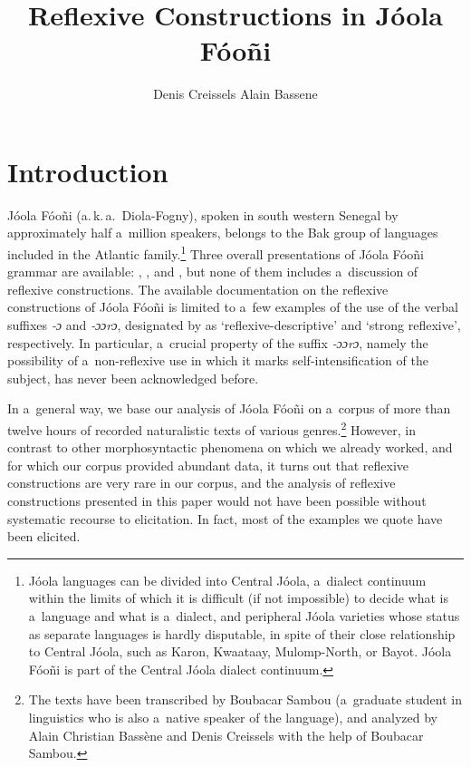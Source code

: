 \documentclass[output=paper]{langscibook}
\author{%
  Denis Creissels%
  \affiliation{Laboratoire Dynamique Du Langage (CNRS \& Université Lyon 2, UMR 5596)}
  \lastand%
  Alain Bassene%
  \affiliation{Université Cheikh Anta Diop, Dakar}
}
\title{Reflexive Constructions in Jóola Fóoñi}
\begin{document}
\maketitle

\section{Introduction}%

Jóola Fóoñi (a.\,k.\,a.\ Diola-Fogny), spoken in south western Senegal by
approximately half a~million speakers, belongs to the Bak group of languages
included in the Atlantic family.\footnote{ Jóola languages can be divided into
  Central Jóola, a~dialect continuum within the limits of which it is difficult
  (if not impossible) to decide what is a~language and what is a~dialect, and
  peripheral Jóola varieties whose status as separate languages is hardly
  disputable, in spite of their close relationship to Central Jóola, such as
  Karon, Kwaataay, Mulomp-North, or Bayot.  Jóola Fóoñi is part of the Central
  Jóola dialect continuum. } Three overall presentations of Jóola Fóoñi grammar
are available: \citet{Weiss1939}, \citet{Sapir1965}, and \citet{Hopkins1995},
but none of them includes a~discussion of reflexive constructions.  The
available documentation on the reflexive constructions of Jóola Fóoñi is
limited to a~few examples of the use of the verbal suffixes \textit{‑ɔ} and
\textit{‑ɔɔrɔ}, designated by \citet[51]{Sapir1965} as `reflexive-descriptive'
and `strong reflexive', respectively.  In particular, a~crucial property of the
suffix \textit{‑ɔɔrɔ}, namely the possibility of a~non-reflexive use in which it
marks self-intensification of the subject, has never been acknowledged before.

In a~general way, we base our analysis of Jóola Fóoñi on a~corpus of more than
twelve hours of recorded naturalistic texts of various genres.\footnote{The
  texts have been transcribed by Boubacar Sambou (a~graduate student in
  linguistics who is also a~native speaker of the language), and analyzed by
  Alain Christian Bassène and Denis Creissels with the help of Boubacar
  Sambou. } However, in contrast to other morphosyntactic phenomena on which we
already worked, and for which our corpus provided abundant data, it turns out
that reflexive constructions are very rare in our corpus, and the analysis of
reflexive constructions presented in this paper would not have been possible
without systematic recourse to elicitation.  In fact, most of the examples we
quote have been elicited.
\end{document}
